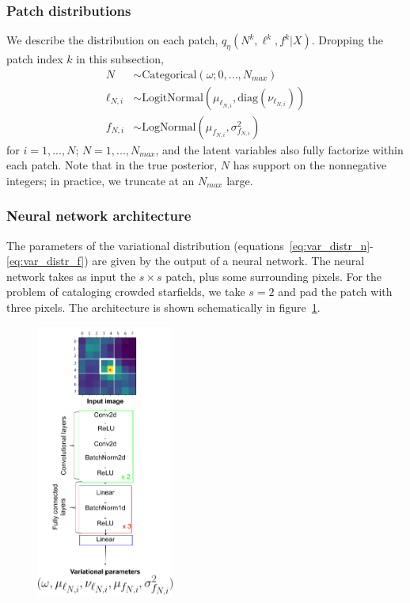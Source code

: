 \subsubsection{Patch distributions}
We describe the distribution on each patch, $q_\eta(N^k, \ell^k, f^k | X)$. 
Dropping the patch index $k$ in this subsection,
\begin{align}
    N &\sim \text{Categorical}(\omega; 0, ..., N_{max}) \label{eq:var_distr_n}\\
	\ell_{N, i} &\sim \text{LogitNormal}(\mu_{\ell_{N, i}}, \text{diag}(\nu_{\ell_{N, i}}) )\label{eq:var_distr_loc}\\
	f_{N, i} &\sim \text{LogNormal}(\mu_{f_{N, i}}, \sigma^2_{f_{N, i}}) \label{eq:var_distr_f}
\end{align}
for $i = 1, ..., N$; $N = 1, ..., N_{max}$, and the latent variables also fully factorize within each patch. Note that in the true posterior, $N$ has support on the nonnegative integers; in practice, we truncate at an $N_{max}$ large. 

\subsubsection{Neural network architecture}
The parameters of the variational distribution (equations~\ref{eq:var_distr_n}-\ref{eq:var_distr_f}) are given by the output of a neural network. The neural network takes as input the $s \times s$ patch, plus some surrounding pixels. 
For the problem of cataloging crowded starfields, we take $s = 2$ and pad the patch with three pixels. The architecture is shown schematically in figure~\ref{fig:starnet_arch}. 

\begin{figure}[h]
    \centering
    \includegraphics[width=0.4\textwidth]{figures/starnet_archetecture2.png}    
    \vspace{-0.5cm}
    \caption{}
    \label{fig:starnet_arch}
\end{figure}


